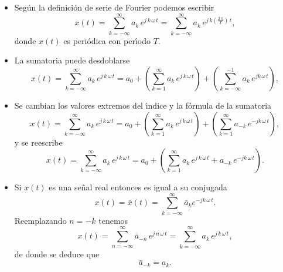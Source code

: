 \begin{itemize}

        \item Seg\'{u}n la definici\'{o}n de serie de Fourier podemos escribir
        \begin{equation}
                x\left( t\right) =
                        \sum_{k=-\infty }^{\infty }a_{k} \, e^{j \, k \, \omega \, t}=
                        \sum_{k=-\infty }^{\infty }a_{k} \, e^{j \, k \left( \frac{2 \, \pi }{T}\right) \, t},
        \end{equation}
        donde $x\left( t\right) $ es peri\'{o}dica con per\'{\i}odo $T.$

        \item   La sumatoria puede desdoblarse 
        \begin{equation}
                x\left( t\right) =
                        \sum_{k=-\infty }^{\infty }a_{k} \, e^{j \, k \, \omega \, t}=
                        a_{0}+
                        \left( \sum_{k=1}^{\infty }a_{k} \, e^{j \, k \, \omega \, t}\right) +
                        \left(\sum_{k=-\infty }^{-1}a_{k} \, e^{jk \, \omega \, t}\right) ,
        \end{equation}
        
        \item   Se cambian los valores extremos del \'{\i}ndice y la f\'{o}rmula de la sumatoria 
        \begin{equation}
                x\left( t\right) =
                        \sum_{k=-\infty }^{\infty }a_{k} \, e^{j \, k \, \omega \, t}=
                        a_{0}+
                        \left( \sum_{k=1}^{\infty }a_{k} \, e^{j \, k \, \omega \, t}\right) +
                        \left(\sum_{k=1}^{\infty }a_{-k} \, e^{-jk \, \omega \, t}\right) ,
        \end{equation}
        y se reescribe 
        \begin{equation}
                x\left( t\right) =
                        \sum_{k=-\infty }^{\infty }a_{k} \, e^{j \, k \, \omega \, t}=
                        a_{0}+
                        \left( \sum_{k=1}^{\infty }a_{k} \, e^{j \, k \, \omega \, t}+a_{-k} \, e^{-jk \, \omega \, t}\right) .
\end{equation}
        
        \item   Si $x\left( t\right) $ es una se\~{n}al real entonces es igual a su conjugada
\begin{equation}
      x\left( t\right) = \bar{x}\left( t\right) =\sum_{k=-\infty }^{\infty }\bar{a}_{k}^{ }e^{-jk \, \omega \, t}.
\end{equation}
        Reemplazando $n=-k$ tenemos 
        \begin{equation}
                x\left( t\right) =
                        \sum_{n=-\infty }^{\infty }\bar{a}_{-n} \, e^{j \, n \, \omega \, t}=
                        \sum_{k=-\infty }^{\infty }a_{k} \, e^{j \, k \, \omega \, t},
        \end{equation}
        de donde se deduce que 
        \begin{equation}
                \bar{a}_{-k} = a_{k}.
        \end{equation}


\end{itemize}
